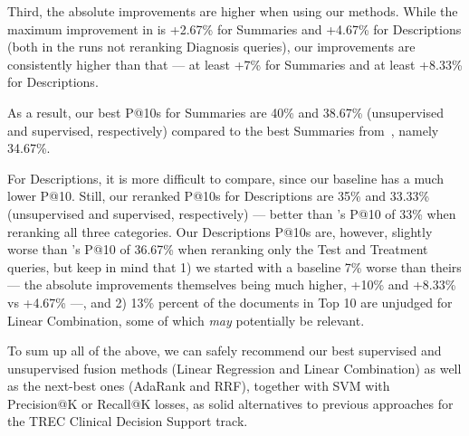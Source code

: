 Third, the absolute improvements are higher when using our methods.
While the maximum improvement
in \cite{choi} is +2.67\% for Summaries and +4.67\% for Descriptions (both in the runs not reranking Diagnosis queries),
our improvements are consistently
higher than that --- at least +7\% for Summaries and at least +8.33\% for Descriptions.

As a result, our best P@10s for Summaries are 40\% and 38.67\%
(unsupervised and supervised, respectively) compared to the best Summaries from~\cite{choi}, namely 34.67\%.

For Descriptions, it is more difficult to compare, since our baseline has a much lower P@10.
Still, our reranked P@10s for Descriptions are 35\% and 33.33\% (unsupervised and supervised, respectively)
 --- better than \cite{choi}'s P@10 of 33\% when reranking all three categories.
Our Descriptions P@10s are, however, slightly worse
than \cite{choi}'s P@10 of 36.67\% when reranking only the Test and Treatment queries, but keep in mind that
1) we started with a baseline 7\% worse than theirs --- the absolute improvements themselves being much higher, +10\% and +8.33\%
vs +4.67\% ---, and 2) 13\% percent of the documents in Top 10 are unjudged for Linear Combination,
some of which \emph{may} potentially be relevant.

To sum up all of the above, we can safely recommend our best supervised and unsupervised fusion methods
(Linear Regression and Linear Combination) as well as the next-best ones (AdaRank and RRF),
together with SVM with Precision@K or Recall@K losses,
as solid alternatives to previous approaches for the TREC Clinical Decision Support track.


%








